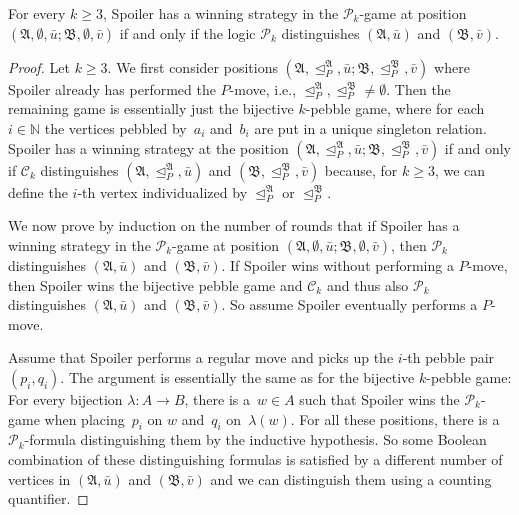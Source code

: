 \documentclass[]{lmcs}
\newcommand{\nat}{\mathbb{N}}
\newcommand{\tup}[1]{\bar{#1}}
\newcommand{\vertA}{u}
\newcommand{\vertB}{v}
\newcommand{\vertC}{w}
\newcommand{\StructA}{\mathfrak{A}}
\newcommand{\StructB}{\mathfrak{B}}
\newcommand{\StructVA}{A}
\newcommand{\StructVB}{B}
\newcommand{\Ck}[1]{\mathcal{C}_{#1}}
\newcommand{\gamebij}{\lambda}
\newcommand{\indRel}{\trianglelefteq}
\newcommand{\Pk}[1]{\mathcal{P}_{#1}}
\begin{document}
\begin{lem}
	\label{lem:pk-iff-pk-game}
	For every $k \geq 3$,
	Spoiler has a winning strategy in the $\Pk{k}$-game 
	at position $(\StructA, \emptyset,\tup{\vertA}; \StructB, \emptyset, \tup{\vertB})$
	if and only if the logic $\Pk{k}$ distinguishes $(\StructA, \tup{\vertA})$ and $(\StructB, \tup{\vertB})$.
\end{lem}
\begin{proof}
	Let $k \geq 3$.
	We first consider positions $(\StructA, \indRel_P^\StructA, \tup{\vertA};\StructB, \indRel_P^\StructB, \tup{\vertB})$ where Spoiler already has performed the $P$-move,
	i.e., $\indRel_P^\StructA,  {\indRel_P^\StructB} \neq \emptyset$.
	Then the remaining game is essentially just the 
	bijective $k$-pebble game,
	where for each~$i\in \nat$ the vertices pebbled by~$a_i$ and~$b_i$ are put in a unique singleton relation.
	Spoiler has a winning strategy at the position $(\StructA, \indRel_P^\StructA, \tup{\vertA}; \StructB, \indRel_P^\StructB, \tup{\vertB})$ if and only if $\Ck{k}$
	distinguishes $(\StructA, \indRel_P^\StructA, \tup{\vertA})$ and  $(\StructB, \indRel_P^\StructB, \tup{\vertB})$ because, for $k\geq 3$,
	we can define the $i$-th vertex individualized by $\indRel_P^\StructA$ or $\indRel_P^\StructB$.
	

	We now prove by induction on the number of rounds
	that if Spoiler has a winning strategy in the $\Pk{k}$-game at position $(\StructA, \emptyset,\tup{\vertA}; \StructB, \emptyset, \tup{\vertB})$,
	then $\Pk{k}$ distinguishes $(\StructA, \tup{\vertA})$ and $(\StructB, \tup{\vertB})$.
	If Spoiler wins without performing a $P$-move,
	then Spoiler wins the bijective pebble game and $\Ck{k}$ and thus also $\Pk{k}$ distinguishes $(\StructA, \tup{\vertA})$ and $(\StructB, \tup{\vertB})$.
	So assume Spoiler eventually performs a $P$-move.
	
	Assume that  Spoiler performs a regular move and picks up the $i$-th pebble pair $(p_i,q_i)$.
	The argument is essentially the same as for the bijective $k$-pebble game:
	For every bijection $\gamebij \colon \StructVA \to \StructVB$,
	there is a~$\vertC \in \StructVA$ such that 
	Spoiler wins the $\Pk{k}$-game 
	when placing~$p_i$ on $\vertC$ and~$q_i$ on~$\gamebij(\vertC)$.
	For all these positions, there is a $\Pk{k}$-formula distinguishing them by the inductive hypothesis.
	So some Boolean combination of these distinguishing formulas
	is satisfied by a different number of vertices in $(\StructA, \tup{\vertA})$ and $(\StructB, \tup{\vertB})$
	and we can distinguish them using a counting quantifier.
	

\end{proof}
\end{document}
